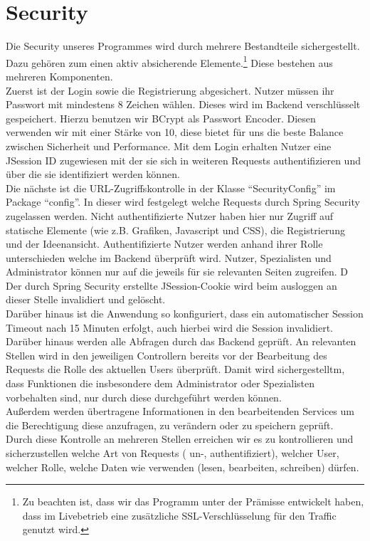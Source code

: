 \section{Security}
\label{Security}

Die Security unseres Programmes wird durch mehrere Bestandteile sichergestellt.\\
Dazu gehören zum einen aktiv absicherende Elemente.\footnote{Zu beachten ist, dass wir das Programm unter der Prämisse entwickelt haben, dass im Livebetrieb eine zusätzliche SSL-Verschlüsselung für den Traffic genutzt wird.}
Diese bestehen aus mehreren Komponenten.\\
Zuerst ist der Login sowie die Registrierung abgesichert. Nutzer müssen ihr Passwort mit mindestens 8 Zeichen wählen. Dieses wird im Backend verschlüsselt gespeichert. Hierzu benutzen wir BCrypt als Passwort Encoder. Diesen verwenden wir mit einer Stärke von 10, diese bietet für uns die beste Balance zwischen Sicherheit und Performance. Mit dem Login erhalten Nutzer eine JSession ID zugewiesen mit der sie sich in weiteren Requests authentifizieren und über die sie identifiziert werden können.\\
Die nächste ist die URL-Zugriffskontrolle in der Klasse \enquote{SecurityConfig} im Package \enquote{config}. In dieser wird festgelegt welche Requests durch Spring Security zugelassen werden. Nicht authentifizierte Nutzer haben hier nur Zugriff auf statische Elemente (wie z.B. Grafiken, Javascript und CSS), die Registrierung und der Ideenansicht.
Authentifizierte Nutzer werden anhand ihrer Rolle unterschieden welche im Backend überprüft wird. Nutzer, Spezialisten und Administrator können nur auf die jeweils für sie relevanten Seiten zugreifen. D
Der durch Spring Security erstellte JSession-Cookie wird beim ausloggen an dieser Stelle invalidiert und gelöscht.\\
Darüber hinaus ist die Anwendung so konfiguriert, dass ein automatischer Session Timeout nach 15 Minuten erfolgt, auch hierbei wird die Session invalidiert.\\
Darüber hinaus werden alle Abfragen durch das Backend geprüft. An relevanten Stellen wird in den jeweiligen Controllern bereits vor der Bearbeitung des Requests die Rolle des aktuellen Users überprüft. Damit wird sichergestelltm, dass Funktionen die insbesondere dem Administrator oder Spezialisten vorbehalten sind, nur durch diese durchgeführt werden können. \\
Außerdem werden übertragene Informationen in den bearbeitenden Services um die Berechtigung diese anzufragen, zu verändern oder zu speichern geprüft.\\
Durch diese Kontrolle an mehreren Stellen erreichen wir es zu kontrollieren und sicherzustellen welche Art von Requests ( un-, authentifiziert), welcher User, welcher Rolle, welche Daten wie verwenden (lesen, bearbeiten, schreiben) dürfen.\\



